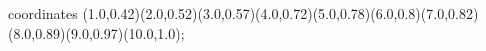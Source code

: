 					coordinates { (1.0,0.42)(2.0,0.52)(3.0,0.57)(4.0,0.72)(5.0,0.78)(6.0,0.8)(7.0,0.82)(8.0,0.89)(9.0,0.97)(10.0,1.0)};